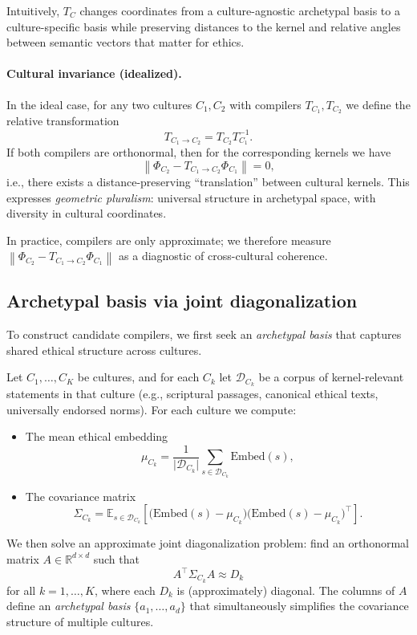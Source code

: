 \documentclass[11pt]{article}
\begin{document}
Intuitively, \(T_C\) changes coordinates from a culture-agnostic archetypal basis to a culture-specific basis while preserving distances to the kernel and relative angles between semantic vectors that matter for ethics.

\paragraph{Cultural invariance (idealized).}
In the ideal case, for any two cultures \(C_1, C_2\) with compilers \(T_{C_1}, T_{C_2}\) we define the relative transformation
\[
T_{C_1 \to C_2} = T_{C_2} T_{C_1}^{-1}.
\]
If both compilers are orthonormal, then for the corresponding kernels we have
\[
\left\| \Phi_{C_2} - T_{C_1 \to C_2} \Phi_{C_1} \right\| = 0,
\]
i.e., there exists a distance-preserving ``translation'' between cultural kernels. This expresses \emph{geometric pluralism}: universal structure in archetypal space, with diversity in cultural coordinates.

In practice, compilers are only approximate; we therefore measure \(\left\| \Phi_{C_2} - T_{C_1 \to C_2} \Phi_{C_1} \right\|\) as a diagnostic of cross-cultural coherence.

\subsection{Archetypal basis via joint diagonalization}

To construct candidate compilers, we first seek an \emph{archetypal basis} that captures shared ethical structure across cultures.

Let \(C_1, \dots, C_K\) be cultures, and for each \(C_k\) let \(\mathcal{D}_{C_k}\) be a corpus of kernel-relevant statements in that culture (e.g., scriptural passages, canonical ethical texts, universally endorsed norms). For each culture we compute:

\begin{itemize}
    \item The mean ethical embedding
    \[
    \mu_{C_k} = \frac{1}{\lvert \mathcal{D}_{C_k} \rvert} \sum_{s \in \mathcal{D}_{C_k}} \mathrm{Embed}(s),
    \]
    \item The covariance matrix
    \[
    \Sigma_{C_k} = \mathbb{E}_{s \in \mathcal{D}_{C_k}} \left[ \bigl( \mathrm{Embed}(s) - \mu_{C_k} \bigr) \bigl( \mathrm{Embed}(s) - \mu_{C_k} \bigr)^{\top} \right].
    \]
\end{itemize}

We then solve an approximate joint diagonalization problem: find an orthonormal matrix \(A \in \mathbb{R}^{d \times d}\) such that
\[
A^{\top} \Sigma_{C_k} A \approx D_k
\]
for all \(k = 1, \dots, K\), where each \(D_k\) is (approximately) diagonal. The columns of \(A\) define an \emph{archetypal basis} \(\{ a_1, \dots, a_d \}\) that simultaneously simplifies the covariance structure of multiple cultures.
\end{document}
